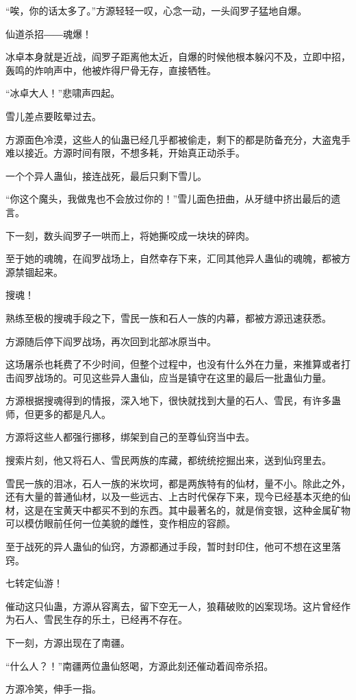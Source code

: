 \begin{this_body}
“唉，你的话太多了。”方源轻轻一叹，心念一动，一头阎罗子猛地自爆。

仙道杀招――魂爆！

冰卓本身就是近战，阎罗子距离他太近，自爆的时候他根本躲闪不及，立即中招，轰鸣的炸响声中，他被炸得尸骨无存，直接牺牲。

“冰卓大人！”悲啸声四起。

雪儿差点要眩晕过去。

方源面色冷漠，这些人的仙蛊已经几乎都被偷走，剩下的都是防备充分，大盗鬼手难以接近。方源时间有限，不想多耗，开始真正动杀手。

一个个异人蛊仙，接连战死，最后只剩下雪儿。

“你这个魔头，我做鬼也不会放过你的！”雪儿面色扭曲，从牙缝中挤出最后的遗言。

下一刻，数头阎罗子一哄而上，将她撕咬成一块块的碎肉。

至于她的魂魄，在阎罗战场上，自然幸存下来，汇同其他异人蛊仙的魂魄，都被方源禁锢起来。

搜魂！

熟练至极的搜魂手段之下，雪民一族和石人一族的内幕，都被方源迅速获悉。

方源随后停下阎罗战场，再次回到北部冰原当中。

这场屠杀也耗费了不少时间，但整个过程中，也没有什么外在力量，来推算或者打击阎罗战场的。可见这些异人蛊仙，应当是镇守在这里的最后一批蛊仙力量。

方源根据搜魂得到的情报，深入地下，很快就找到大量的石人、雪民，有许多蛊师，但更多的都是凡人。

方源将这些人都强行挪移，绑架到自己的至尊仙窍当中去。

搜索片刻，他又将石人、雪民两族的库藏，都统统挖掘出来，送到仙窍里去。

雪民一族的泪冰，石人一族的米坎坷，都是两族特有的仙材，量不小。除此之外，还有大量的普通仙材，以及一些远古、上古时代保存下来，现今已经基本灭绝的仙材，这是在宝黄天中都买不到的东西。其中最著名的，就是俏变银，这种金属矿物可以模仿眼前任何一位美貌的雌性，变作相应的容颜。

至于战死的异人蛊仙的仙窍，方源都通过手段，暂时封印住，他可不想在这里落窍。

七转定仙游！

催动这只仙蛊，方源从容离去，留下空无一人，狼藉破败的凶案现场。这片曾经作为石人、雪民生存的乐土，已经再不存在。

下一刻，方源出现在了南疆。

“什么人？！”南疆两位蛊仙怒喝，方源此刻还催动着阎帝杀招。

方源冷笑，伸手一指。


\end{this_body}
